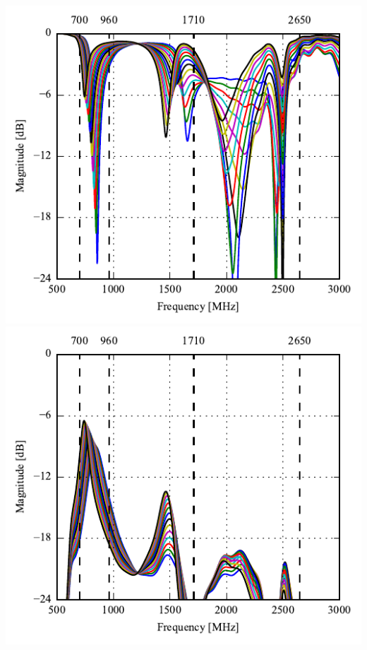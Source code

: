\begin{frame}
\begin{minipage}[t]{0.49\linewidth}
    \includegraphics[width=0.78\linewidth]{img/henrik/mono/s22} \\
    \includegraphics[width=0.78\linewidth]{img/henrik/mono/s21-s22} 

  \end{minipage}    
\end{frame}

